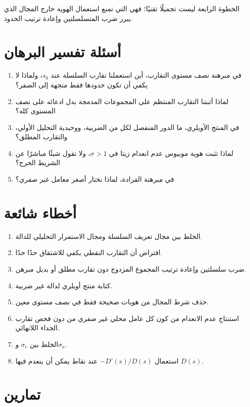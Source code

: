 الخطوة الرابعة ليست تجميلًا تقنيًا؛ فهي التي تمنع استعمال الهوية خارج
المجال الذي يبرر ضرب المتسلسلتين وإعادة ترتيب الحدود.

\section{أسئلة تفسير البرهان}

\begin{enumerate}
  \item في مبرهنة نصف مستوى التقارب، أين استعملنا تقارب السلسلة عند
  \(s_0\)، ولماذا لا يكفي أن تكون حدودها فقط متجهة إلى الصفر؟
  \item لماذا أثبتنا التقارب المنتظم على المجموعات المدمجة بدل ادعائه على
  نصف المستوى كله؟
  \item في المنتج الأويلري، ما الدور المنفصل لكل من الضربية، ووحيدية
  التحليل الأولي، والتقارب المطلق؟
  \item لماذا تثبت هوية موبيوس عدم انعدام زيتا في \(\sigma>1\)، ولا تقول
  شيئًا مباشرًا عن الشريط الحرج؟
  \item في مبرهنة الفرادة، لماذا نختار أصغر معامل غير صفري؟
\end{enumerate}

\section{أخطاء شائعة}

\begin{enumerate}
  \item الخلط بين مجال تعريف السلسلة ومجال الاستمرار التحليلي للدالة.
  \item افتراض أن التقارب النقطي يكفي للاشتقاق حدًا حدًا.
  \item ضرب سلسلتين وإعادة ترتيب المجموع المزدوج دون تقارب مطلق أو بديل
  مبرهن.
  \item كتابة منتج أويلري لدالة غير ضربية.
  \item حذف شرط المجال من هويات صحيحة فقط في نصف مستوى معين.
  \item استنتاج عدم الانعدام من كون كل عامل محلي غير صفري من دون فحص
  تقارب الجداء اللانهائي.
  \item الخلط بين \(\sigma_c\) و\(\sigma_a\).
  \item استعمال \(-D'(s)/D(s)\) عند نقاط يمكن أن ينعدم فيها \(D(s)\).
\end{enumerate}

\section{تمارين}

